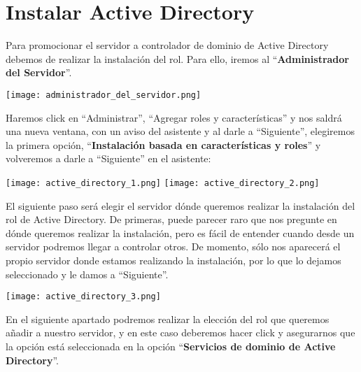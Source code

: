 \section{Instalar Active Directory}
Para promocionar el servidor a controlador de dominio de Active Directory debemos de realizar la instalación del rol. Para ello, iremos al “\textbf{Administrador del Servidor}”.

\begin{tcolorbox}[title=Panel del Administrador del servidor]
    \begin{center}
        \texttt{[image: administrador\_del\_servidor.png]}
    \end{center}
\end{tcolorbox}

Haremos click en “Administrar”, “Agregar roles y características” y nos saldrá una nueva ventana, con un aviso del asistente y al darle a “Siguiente”, elegiremos la primera opción, “\textbf{Instalación basada en características y roles}” y volveremos a darle a “Siguiente” en el asistente:

\begin{center}
    \texttt{[image: active\_directory\_1.png]}
    \hfill
    \texttt{[image: active\_directory\_2.png]}
\end{center}

{
    \begin{minipage}{0.6\linewidth}
        \setlength{\parskip}{1.2em}
        El siguiente paso será elegir el servidor dónde queremos realizar la instalación del rol de Active Directory. De primeras, puede parecer raro que nos pregunte en dónde queremos realizar la instalación, pero es fácil de entender cuando desde un servidor podremos llegar a controlar otros. De momento, sólo nos aparecerá el propio servidor donde estamos realizando la instalación, por lo que lo dejamos seleccionado y le damos a “Siguiente”.
    \end{minipage}
    \hfill
    \begin{minipage}{0.36\linewidth}
        \vspace{-5pt}
        \texttt{[image: active\_directory\_3.png]}
    \end{minipage}
}

En el siguiente apartado podremos realizar la elección del rol que queremos añadir a nuestro servidor, y en este caso deberemos hacer click y asegurarnos que la opción está seleccionada en la opción “\textbf{Servicios de dominio de Active Directory}”.


